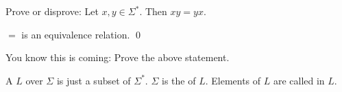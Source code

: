 \newpage
\begin{ex} Prove or disprove: Let $x, y \in \Sigma^*$. Then $xy = yx$.
\end{ex}


\newpage
\begin{prop}
$=$ is an equivalence relation.
\qed
\end{prop}

\begin{ex}
You know this is coming: Prove the above statement.
\end{ex}





\newpage
\begin{defn}
  A
  $L$ over $\Sigma$ is just a subset of $\Sigma^*$.
  $\Sigma$ is the
  of $L$.
  Elements of $L$ are called
  \sidebarskip{12pt}
  in $L$.
\end{defn}
